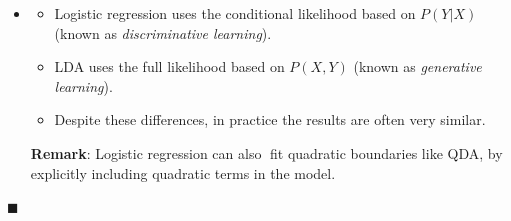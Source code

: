 \documentclass[]{book}
\providecommand{\tightlist}{%
  \setlength{\itemsep}{0pt}\setlength{\parskip}{0pt}}
\newenvironment{rmdblock}[1]
  {\begin{shaded*}
  \begin{itemize}
  \renewcommand{\labelitemi}{
    \raisebox{-.7\height}[0pt][0pt]{
      {\setkeys{Gin}{width=2em,keepaspectratio}\texttt{[image: img/icons/\#1]}}
    }
  }
  \item
  }
  {
  \end{itemize}
  \end{shaded*}
  }
\newenvironment{rmdinsight}
  {\begin{rmdblock}{insight}}
  {\end{rmdblock}}
\begin{document}
\begin{rmdinsight}
\begin{itemize}
\tightlist
\item
  Logistic regression uses the conditional likelihood based on
  \(P(Y|X)\) (known as \emph{discriminative learning}).
\item
  LDA uses the full likelihood based on \(P(X,Y )\) (known as
  \emph{generative learning}).
\item
  Despite these differences, in practice the results are often very
  similar.
\end{itemize}

\textbf{Remark}: Logistic regression can also fit quadratic boundaries
like QDA, by explicitly including quadratic terms in the model.
\end{rmdinsight}

◼
\end{document}
